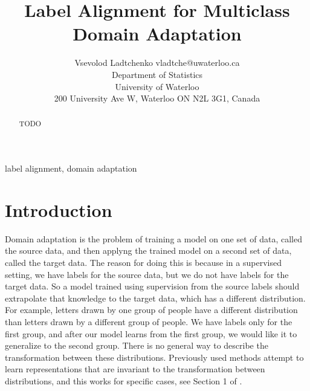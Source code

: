 \documentclass[twoside,11pt]{article}
\begin{document}
\title{Label Alignment for Multiclass Domain Adaptation}

\author{\name Vsevolod Ladtchenko \email vladtche@uwaterloo.ca \\
       \addr Department of Statistics\\
       University of Waterloo\\
       200 University Ave W, Waterloo ON N2L 3G1, Canada}

\editor{}

\maketitle

\begin{abstract}%
TODO
\end{abstract}

\begin{keywords}
  label alignment, domain adaptation
\end{keywords}

\section{Introduction}

Domain adaptation is the problem of training a model on one set of data, called the source data, and then applyng the trained model on a second set of data, called the target data. The reason for doing this is because in a supervised setting, we have labels for the source data, but we do not have labels for the target data. So a model trained using supervision from the source labels should extrapolate that knowledge to the target data, which has a different distribution. For example, letters drawn by one group of people have a different distribution than letters drawn by a different group of people. We have labels only for the first group, and after our model learns from the first group, we would like it to generalize to the second group. There is no general way to describe the transformation between these distributions. Previously used methods attempt to learn representations that are invariant to the transformation between distributions, and this works for specific cases, see Section 1 of \cite{imani2022label}. 
\end{document}
